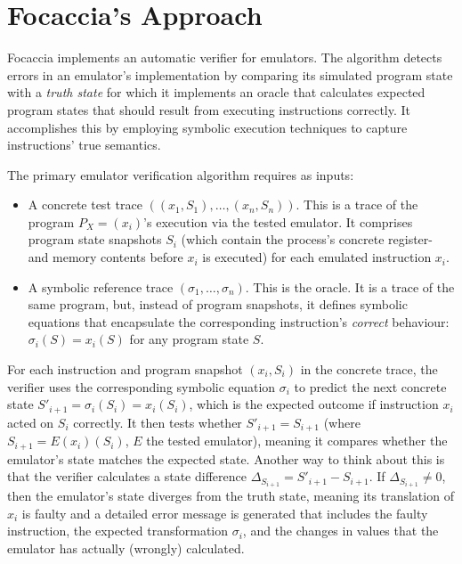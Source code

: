 \section{Focaccia's Approach}

Focaccia implements an automatic verifier for emulators. The algorithm detects errors in an emulator's implementation by
comparing its simulated program state with a \textit{truth state} for which it implements an oracle that calculates
expected program states that should result from executing instructions correctly. It accomplishes this by employing
symbolic execution techniques to capture instructions' true semantics.

The primary emulator verification algorithm requires as inputs:

\begin{itemize}
    \item A concrete test trace $((x_1, S_1), …, (x_n, S_n))$. This is a trace of the program $P_X = (x_i)$'s execution
        via the tested emulator. It comprises program state snapshots $S_i$ (which contain the process's concrete
        register- and memory contents before $x_i$ is executed) for each emulated instruction $x_i$.
    \item A symbolic reference trace $(\sigma_1, …, \sigma_n)$. This is the oracle. It is a trace of the same program,
        but, instead of program snapshots, it defines symbolic equations that encapsulate the corresponding
        instruction's \textit{correct} behaviour: $\sigma_i(S) = x_i(S)$ for any program state $S$.
\end{itemize}

For each instruction and program snapshot $(x_i, S_i)$ in the concrete trace, the verifier uses the corresponding
symbolic equation $\sigma_i$ to predict the next concrete state $S'_{i+1} = \sigma_i(S_i) = x_i(S_i)$, which is the
expected outcome if instruction $x_i$ acted on $S_i$ correctly. It then tests whether $S'_{i+1} = S_{i+1}$ (where
$S_{i+1} = E(x_i)(S_i)$, $E$ the tested emulator), meaning it compares whether the emulator's state matches the expected
state. Another way to think about this is that the verifier calculates a state difference $\Delta_{S_{i+1}} = S'_{i+1}
- S_{i+1}$. If $\Delta_{S_{i+1}} \neq 0$, then the emulator's state diverges from the truth state, meaning its
translation of $x_i$ is faulty and a detailed error message is generated that includes the faulty instruction, the
expected transformation $\sigma_i$, and the changes in values that the emulator has actually (wrongly) calculated.

